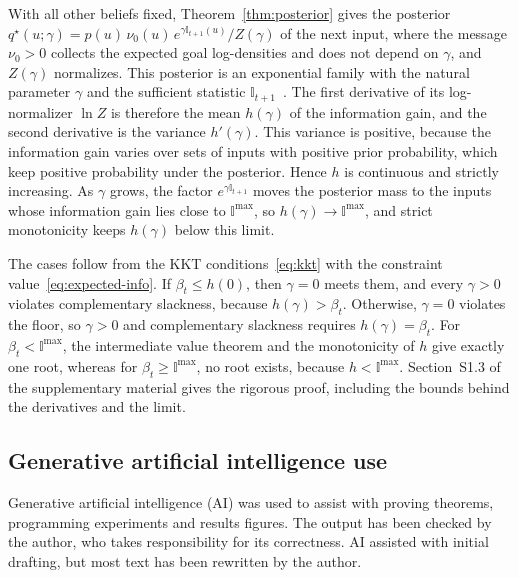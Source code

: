 \documentclass{l4dc2027}
\newenvironment{proofof}[1]{\par\noindent{\bfseries\upshape Proof of #1\ }}{\jmlrQED}
\begin{document}
\begin{proofof}{Lemma~\ref{lem:multiplier}} \label{appx:info_multiplier}
With all other beliefs fixed, Theorem~\ref{thm:posterior} gives the posterior $q^\star(u; \gamma) = p(u)\, \nu_0(u)\, e^{\gamma \mathbb{I}_{t+1}(u)} / Z(\gamma)$ of the next input, where the message $\nu_0 > 0$ collects the expected goal log-densities and does not depend on $\gamma$, and $Z(\gamma)$ normalizes. This posterior is an exponential family with the natural parameter $\gamma$ and the sufficient statistic $\mathbb{I}_{t+1}$~\citep{wainwright2008graphical}. The first derivative of its log-normalizer $\ln Z$ is therefore the mean $h(\gamma)$ of the information gain, and the second derivative is the variance $h'(\gamma)$. This variance is positive, because the information gain varies over sets of inputs with positive prior probability, which keep positive probability under the posterior. Hence $h$ is continuous and strictly increasing. As $\gamma$ grows, the factor $e^{\gamma \mathbb{I}_{t+1}}$ moves the posterior mass to the inputs whose information gain lies close to $\mathbb{I}^{\max}$, so $h(\gamma) \to \mathbb{I}^{\max}$, and strict monotonicity keeps $h(\gamma)$ below this limit.

The cases follow from the KKT conditions~\eqref{eq:kkt} with the constraint value~\eqref{eq:expected-info}. If $\beta_t \leq h(0)$, then $\gamma = 0$ meets them, and every $\gamma > 0$ violates complementary slackness, because $h(\gamma) > \beta_t$. Otherwise, $\gamma = 0$ violates the floor, so $\gamma > 0$ and complementary slackness requires $h(\gamma) = \beta_t$. For $\beta_t < \mathbb{I}^{\max}$, the intermediate value theorem and the monotonicity of $h$ give exactly one root, whereas for $\beta_t \geq \mathbb{I}^{\max}$, no root exists, because $h < \mathbb{I}^{\max}$. Section~S1.3 of the supplementary material gives the rigorous proof, including the bounds behind the derivatives and the limit.
\end{proofof}


\subsection*{Generative artificial intelligence use}

Generative artificial intelligence (AI) was used to assist with proving theorems, programming experiments and results figures. The output has been checked by the author, who takes responsibility for its correctness. AI assisted with initial drafting, but most text has been rewritten by the author.



\end{document}
